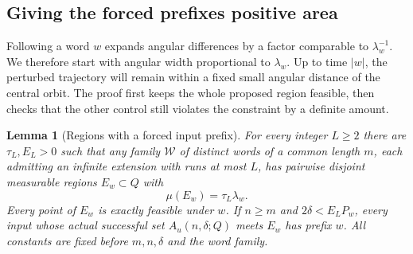 \documentclass[11pt]{amsart}
\newtheorem{lemma}[theorem]{Lemma}
\theoremstyle{definition}
\theoremstyle{remark}
\numberwithin{equation}{section}
\begin{document}
\subsection{Giving the forced prefixes positive area}
Following a word $w$ expands angular differences by a factor
comparable to $\lambda_w^{-1}$. We therefore start with angular
width proportional to $\lambda_w$. Up to time $|w|$, the perturbed
trajectory will remain within a fixed small angular distance of
the central orbit. The proof first keeps the whole proposed region
feasible, then checks that the other control still violates the
constraint by a definite amount.
\begin{lemma}[Regions with a forced input prefix]\label{lem:massforcing}
For every integer $L\ge2$ there are $\tau_L,E_L>0$ such that
any family $\mathcal W$ of distinct words of a common length $m$,
each admitting an infinite extension with runs at most $L$, has
pairwise disjoint measurable regions $E_w\subset Q$ with
\begin{equation}\label{eq:forcedmass}
\mu(E_w)=\tau_L\lambda_w.
\end{equation}
Every point of $E_w$ is exactly feasible under $w$.
If $n\ge m$ and $2\delta<E_LP_w$, every input whose actual
successful set $A_u(n,\delta;Q)$ meets $E_w$ has prefix $w$.
All constants are fixed before $m,n,\delta$ and the word family.
\end{lemma}
\end{document}
